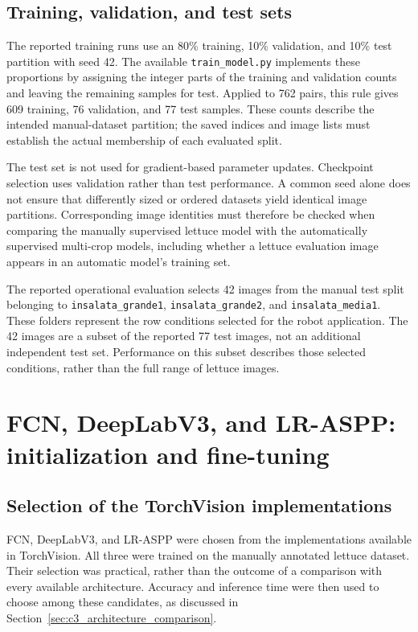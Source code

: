 \subsection{Training, validation, and test sets}
\label{subsec:c3_dataset_splits}

The reported training runs use an 80\% training, 10\% validation, and
10\% test partition with seed 42. The available \texttt{train\_model.py}
implements these proportions by assigning the integer parts of the
training and validation counts and leaving the remaining samples for
test. Applied to 762 pairs, this rule gives 609 training, 76 validation,
and 77 test samples. These counts describe the intended manual-dataset
partition; the saved indices and image lists must establish the actual
membership of each evaluated split.

The test set is not used for gradient-based parameter updates. Checkpoint
selection uses validation rather than test performance. A common seed
alone does not ensure that differently sized or ordered datasets yield
identical image partitions. Corresponding image identities must therefore
be checked when comparing the manually supervised lettuce model with the
automatically supervised multi-crop models, including whether a lettuce
evaluation image appears in an automatic model's training set.

The reported operational evaluation selects 42 images from the manual
test split belonging to \texttt{insalata\_grande1},
\texttt{insalata\_grande2}, and \texttt{insalata\_media1}. These folders
represent the row conditions selected for the robot application. The
42 images are a subset of the reported 77 test images, not an additional
independent test set. Performance on this subset describes those selected
conditions, rather than the full range of lettuce images.

\section{FCN, DeepLabV3, and LR-ASPP: initialization and fine-tuning}
\label{sec:c3_segmentation_models}

\subsection{Selection of the TorchVision implementations}
\label{subsec:c3_model_selection}

FCN, DeepLabV3, and LR-ASPP were chosen from the implementations available
in TorchVision. All three were trained on the manually annotated lettuce
dataset. Their selection was practical, rather than the outcome of a
comparison with every available architecture. Accuracy and inference
time were then used to choose among these candidates, as discussed in
Section~\ref{sec:c3_architecture_comparison}.

